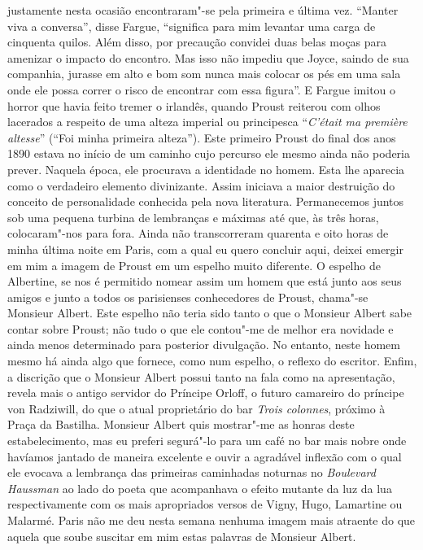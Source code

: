 justamente nesta ocasião encontraram"-se pela primeira e última vez.
``Manter viva a conversa'', disse Fargue, ``significa para mim levantar
uma carga de cinquenta quilos. Além disso, por precaução convidei duas
belas moças para amenizar o impacto do encontro. Mas isso não impediu
que Joyce, saindo de sua companhia, jurasse em alto e bom som nunca mais
colocar os pés em uma sala onde ele possa correr o risco de encontrar
com essa figura''. E Fargue imitou o horror que havia feito tremer o
irlandês, quando Proust reiterou com olhos lacerados a respeito de uma
alteza imperial ou principesca ``\emph{C'était ma première altesse}''
(``Foi minha primeira alteza''). Este primeiro Proust do final dos
anos 1890 estava no início de um caminho cujo percurso ele mesmo ainda
não poderia prever. Naquela época, ele procurava a identidade no homem.
Esta lhe aparecia como o verdadeiro elemento divinizante. Assim iniciava
a maior destruição do conceito de personalidade conhecida pela nova
literatura. Permanecemos juntos sob uma pequena turbina de lembranças
e máximas até que, às três horas, colocaram"-nos para fora. Ainda não
transcorreram quarenta e oito horas de minha última noite em Paris, com
a qual eu quero concluir aqui, deixei emergir em mim a imagem de Proust
em um espelho muito diferente. O espelho de Albertine, se nos é
permitido nomear assim um homem que está junto aos seus amigos e junto a
todos os parisienses conhecedores de Proust, chama"-se Monsieur Albert.
Este espelho não teria sido tanto o que o Monsieur Albert sabe contar
sobre Proust; não tudo o que ele contou"-me de melhor era novidade e
ainda menos determinado para posterior divulgação. No entanto, neste
homem mesmo há ainda algo que fornece, como num espelho, o reflexo do
escritor. Enfim, a discrição que o Monsieur Albert possui tanto na fala
como na apresentação, revela mais o antigo servidor do Príncipe Orloff,
o futuro camareiro do príncipe von Radziwill, do que o atual
proprietário do bar \emph{Trois colonnes}, próximo à Praça da Bastilha.
Monsieur Albert quis mostrar"-me as honras deste estabelecimento, mas eu
preferi segurá"-lo para um café no bar mais nobre onde havíamos jantado
de maneira excelente e ouvir a agradável inflexão com o qual ele evocava
a lembrança das primeiras caminhadas noturnas no \emph{Boulevard
Haussman} ao lado do poeta que acompanhava o efeito mutante da luz da
lua respectivamente com os mais apropriados versos de Vigny, Hugo,
Lamartine ou Malarmé. Paris não me deu nesta semana nenhuma imagem mais
atraente do que aquela que soube suscitar em mim estas palavras de
Monsieur Albert.

